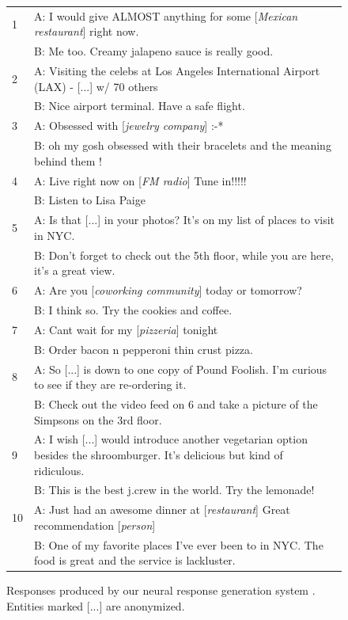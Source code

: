 \documentclass[letterpaper]{article}
\begin{document}
\begin{figure}[ht]
\centering
\begin{small}
\begin{tabular}{ll}\toprule
1& A: I would give ALMOST anything for some [{\it Mexican restaurant}] right now.\\
& B: Me too. Creamy jalapeno sauce is really good.\\
\midrule
2& A: Visiting the celebs at Los Angeles International Airport (LAX) - [...] w/ 70 others\\
& B: Nice airport terminal. Have a safe flight.\\
\midrule
3& A: Obsessed with [{\it jewelry company}] :-*\\
& B: oh my gosh obsessed with their bracelets and the meaning behind them !\\
\midrule
4&A: Live right now on [{\it FM radio}] Tune in!!!!!\\
&B: Listen to Lisa Paige\\
\midrule
5& A: Is that [...] in your photos? It's on my list of places to visit in NYC.\\
& B: Don't forget to check out the 5th floor, while you are here, it's a great view.\\
\midrule
6& A: Are you [{\it coworking community}] today or tomorrow?\\
& B: I think so. Try the cookies and coffee.\\
\midrule
7&A: Cant wait for my [{\it pizzeria}] tonight\\
&B: Order bacon n pepperoni thin crust pizza.\\
\midrule
8&A: So [...] is down to one copy of Pound Foolish. I'm curious to see if they are re-ordering it.\\
&B: Check out the video feed on 6 and take a picture of the Simpsons on the 3rd floor.\\
\midrule
\midrule
9&A: I wish [...] would introduce another vegetarian option besides the shroomburger. It's delicious but kind of ridiculous.\\
&B: This is the best j.crew in the world. Try the lemonade!\\
\midrule
10&A: Just had an awesome dinner at [{\it restaurant}] Great recommendation [{\it person}]\\
&B: One of my favorite places I've ever been to in NYC. The food is great and the service is lackluster.\\
\bottomrule
\end{tabular}
\end{small}
\caption{Responses produced by our neural response generation system \MTaskRF. Entities marked [...] are anonymized.}
\label{fig:examples}
\end{figure}
\end{document}
